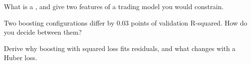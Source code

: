 \begin{interviewq}\label{iq:ml:trees-and-boosting:4}
What is a , and give two features of a trading model you would constrain.
\end{interviewq}

\begin{interviewq}\label{iq:ml:trees-and-boosting:5}
Two boosting configurations differ by 0.03 points of validation R-squared. How do you decide between them?
\end{interviewq}

\begin{interviewq}\label{iq:ml:trees-and-boosting:6}
Derive why boosting with squared loss fits residuals, and what changes with a Huber loss.
\end{interviewq}
